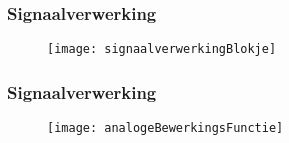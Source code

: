 \begin{frame}
    \frametitle{Signaalverwerking}
    
    \begin{figure}
        \centering
        \texttt{[image: signaalverwerkingBlokje]}
    \end{figure}

\end{frame}

\begin{frame}
    \frametitle{Signaalverwerking}
    
    \begin{figure}
        \centering
        \texttt{[image: analogeBewerkingsFunctie]}
    \end{figure}

\end{frame}